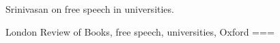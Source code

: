 Srinivasan on free speech in universities.

London Review of Books, free speech, universities, Oxford
===
\nocite{srinivasan2023}